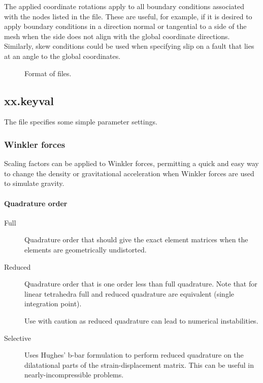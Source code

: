 The applied coordinate rotations apply to all boundary conditions
associated with the nodes listed in the file. These are useful, for
example, if it is desired to apply boundary conditions in a direction
normal or tangential to a side of the mesh when the side does not
align with the global coordinate directions.  Similarly, skew
conditions could be used when specifying slip on a fault that lies at
an angle to the global coordinates.

\begin{figure}[htbp]
  \begin{center}
    
    \caption{Format of  files.}
  \end{center}
\end{figure}

\subsection{xx.keyval}

The  file specifies some simple parameter
settings.

\subsubsection{Winkler forces}

Scaling factors can be applied to Winkler forces, permitting a quick
and easy way to change the density or gravitational acceleration when
Winkler forces are used to simulate gravity.

\paragraph{Quadrature order}

\begin{description}
\item[Full] Quadrature order that should give the exact element
  matrices when the elements are geometrically undistorted.
\item[Reduced] Quadrature order that is one order less than full
  quadrature. Note that for linear tetrahedra full and reduced
  quadrature are equivalent (single integration point).

  \begin{warning}
    Use with caution as reduced quadrature can lead to numerical
    instabilities.
  \end{warning}
  
\item[Selective] Uses Hughes' b-bar formulation to perform reduced
  quadrature on the dilatational parts of the strain-displacement
  matrix.  This can be useful in nearly-incompressible problems.
\end{description}

